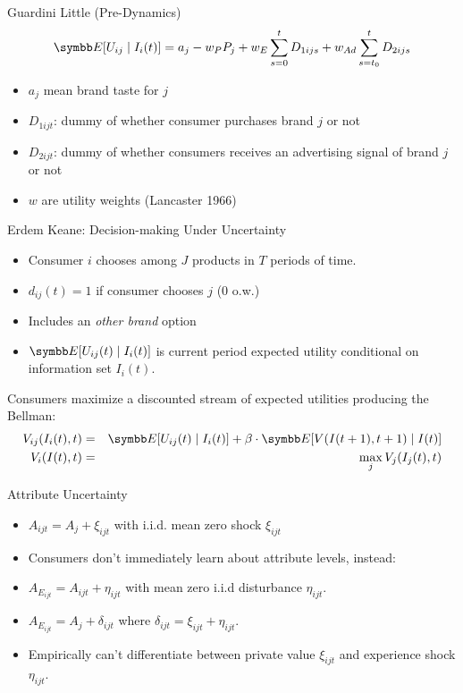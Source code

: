 \documentclass[aspectratio=169,11pt]{beamer}
\begin{document}
\begin{frame}{Guardini Little (Pre-Dynamics)}
\begin{align*}
\E[U_{ij} \mid I_i(t) ] = a_j -w_P P_j + w_E \sum_{s=0}^t D_{1ijs}  + w_{Ad} \sum_{s=t_0}^t D_{2ijs}
\end{align*}
\begin{itemize}
\item $a_j$ mean brand taste for $j$
\item $D_{1ijt}$: dummy of whether consumer purchases brand $j$ or not
\item $D_{2ijt}$: dummy of whether consumers receives an advertising signal of brand $j$ or not
\item $w$ are utility weights (Lancaster 1966)
\end{itemize}
\end{frame} 


\begin{frame}{Erdem Keane: Decision-making Under Uncertainty}
\begin{itemize}
\item Consumer $i$ chooses among $J$ products in $T$ periods of time.
\item $d_{ij}(t)=1$ if consumer chooses $j$ (0 o.w.)
\item Includes an \textit{other brand} option
\item $\E[U_{ij}(t) \mid I_i(t)]$ is current period expected utility conditional on information set $I_i(t)$.
\end{itemize}
Consumers maximize a discounted stream of expected utilities producing the Bellman:
\begin{eqnarray*}
V_{ij}(I_i(t),t) &=& \E[U_{ij}(t) \mid I_i(t)] + \beta \cdot \E[V(I(t+1),t+1) \mid I(t)] \\
V_i(I(t),t) &=& \max_j V_j(I_j(t),t)
\end{eqnarray*}
\end{frame}


\begin{frame}{Attribute Uncertainty}
\begin{itemize}
\item $A_{ijt} = A_j + \xi_{ijt} $ with i.i.d. mean zero shock $\xi_{ijt}$
\item Consumers don't immediately learn about attribute levels, instead:
\item $A_{E_{ijt}} = A_{ijt} + \eta_{ijt}$ with mean zero i.i.d disturbance $\eta_{ijt}$.
\item $A_{E_{ijt}} = A_{j} + \delta_{ijt}$ where $\delta_{ijt} = \xi_{ijt} + \eta_{ijt}$.
\item Empirically can't differentiate between private value $\xi_{ijt}$ and experience shock $\eta_{ijt}$.
\end{itemize}
\end{frame}
\end{document}
